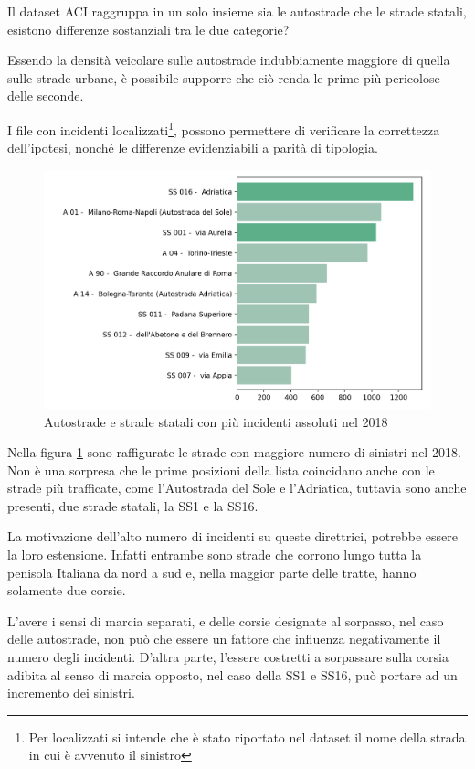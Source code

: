 \documentclass[a4paper]{report}
\begin{document}
Il dataset ACI raggruppa in un solo insieme sia le autostrade che le strade statali, 
esistono differenze sostanziali tra le due categorie? 

Essendo la densità veicolare sulle autostrade indubbiamente 
maggiore di quella sulle strade urbane, è possibile supporre che 
ciò renda le prime più pericolose delle seconde.

I file con incidenti 
localizzati\footnote{Per localizzati si intende che è stato riportato nel dataset 
il nome della strada in cui è avvenuto il sinistro}, 
possono permettere di verificare la correttezza dell'ipotesi, 
nonché le differenze evidenziabili a parità di tipologia. 

\begin{figure}
    \includegraphics[width=\linewidth]{../src/incidenti/incidenti_aci/autostrade/autostrade.png}
    \caption{Autostrade e strade statali con più incidenti assoluti nel 2018}
    \label{fig:incidenti-autostrade}
\end{figure}

Nella figura \ref{fig:incidenti-autostrade} sono  raffigurate le strade con 
maggiore numero di sinistri nel 2018. 
Non è una sorpresa che le prime posizioni della lista coincidano 
anche con le strade più trafficate, come l'Autostrada del Sole e l'Adriatica, 
tuttavia sono anche presenti, due strade statali, la SS1 e la SS16. 

La motivazione dell'alto numero di incidenti su queste direttrici, potrebbe essere 
la loro estensione. Infatti entrambe sono strade che corrono lungo tutta la 
penisola Italiana da nord a sud e, nella maggior parte delle tratte, 
hanno solamente due corsie. 

L'avere i sensi di marcia separati, e delle corsie designate al sorpasso, nel caso 
delle autostrade, non può che essere un fattore che influenza negativamente 
il numero degli incidenti. 
D'altra parte, l'essere costretti a sorpassare sulla corsia adibita al senso di 
marcia opposto, nel caso della SS1 e SS16, può portare ad un incremento dei 
sinistri. 
\end{document}
